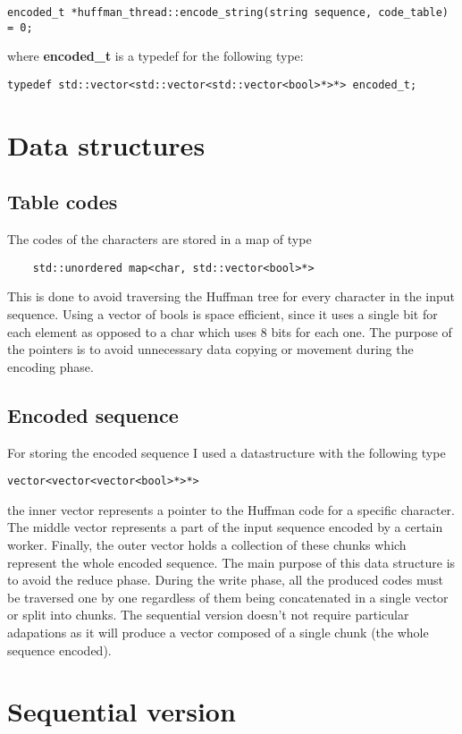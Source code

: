 \documentclass{report}
\begin{document}
\begin{verbatim}
encoded_t *huffman_thread::encode_string(string sequence, code_table) = 0;
\end{verbatim}
where \textbf{encoded\_t} is a typedef for the following type:
\begin{verbatim}
typedef std::vector<std::vector<std::vector<bool>*>*> encoded_t;
\end{verbatim}

\section{Data structures}
\subsection{Table codes}
The codes of the characters are stored in a map of type
\begin{verbatim}
    std::unordered map<char, std::vector<bool>*>
\end{verbatim}
This is done to avoid traversing the Huffman tree for every character in the input sequence.
Using a vector of bools is space efficient, since it uses a single bit for each element
as opposed to a char which uses 8 bits for each one.
The purpose of the pointers is to avoid unnecessary
data copying or movement during the encoding phase.
\subsection{Encoded sequence}
For storing the encoded sequence I used a datastructure
with the following type
\begin{verbatim}
vector<vector<vector<bool>*>*>
\end{verbatim}
the inner vector represents a
pointer to the Huffman code for a specific character. The middle vector
represents a part of the input sequence encoded by a certain worker.
Finally, the outer vector holds a collection of these chunks which represent
the whole encoded sequence.
The main purpose of this data structure is to avoid the reduce phase.
During the write phase, all the produced codes must be traversed one by one regardless
of them being concatenated in a single vector or split into chunks.
The sequential version doesn't not require particular adapations as it
will produce a vector composed of a single chunk (the whole sequence encoded).


\section{Sequential version}
\end{document}
